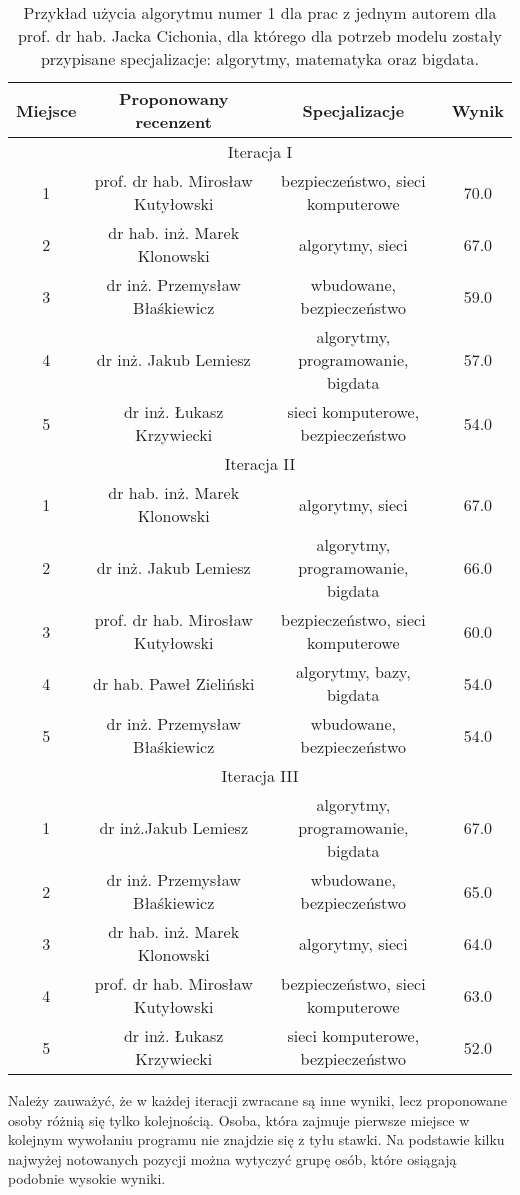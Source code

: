 \begin{table}[h]
        \centering
\begin{tabular}{c|c|c|c}
Miejsce  & Proponowany recenzent& Specjalizacje & Wynik \\  \hline
\multicolumn{4}{c|}{Iteracja I} \\ \hline
1&prof. dr hab. Mirosław Kutyłowski&bezpieczeństwo, sieci komputerowe& 70.0 \\
2&dr hab. inż. Marek Klonowski&algorytmy, sieci&67.0 \\
3&dr inż. Przemysław Błaśkiewicz&wbudowane, bezpieczeństwo& 59.0 \\
4&dr inż. Jakub Lemiesz&algorytmy, programowanie, bigdata& 57.0\\
5&dr inż. Łukasz Krzywiecki& sieci komputerowe, bezpieczeństwo& 54.0\\  \hline
\multicolumn{4}{c|}{Iteracja II} \\ \hline
1&dr hab. inż. Marek Klonowski&algorytmy, sieci&67.0 \\
2&dr inż. Jakub Lemiesz&algorytmy, programowanie, bigdata& 66.0\\
3&prof. dr hab. Mirosław Kutyłowski&bezpieczeństwo, sieci komputerowe& 60.0\\
4&dr hab. Paweł Zieliński&algorytmy, bazy, bigdata& 54.0\\
5&dr inż. Przemysław Błaśkiewicz&wbudowane, bezpieczeństwo& 54.0\\  \hline
\multicolumn{4}{c|}{Iteracja III} \\ \hline
1&dr inż.Jakub Lemiesz&algorytmy, programowanie, bigdata&67.0\\
2&dr inż. Przemysław Błaśkiewicz&wbudowane, bezpieczeństwo& 65.0\\
3&dr hab. inż. Marek Klonowski&algorytmy, sieci&64.0\\
4&prof. dr hab. Mirosław Kutyłowski&bezpieczeństwo, sieci komputerowe&63.0\\
5&dr inż. Łukasz Krzywiecki& sieci komputerowe, bezpieczeństwo&52.0\\  \hline
\end{tabular}
\caption{Przykład użycia algorytmu numer 1 dla prac z jednym autorem dla prof. dr hab. Jacka Cichonia, dla którego dla potrzeb modelu zostały przypisane specjalizacje: algorytmy, matematyka oraz bigdata.}
\label{table:2}
\end{table}

Należy zauważyć, że w każdej iteracji zwracane są inne wyniki, lecz proponowane osoby różnią się tylko kolejnością. Osoba, która zajmuje pierwsze miejsce w kolejnym wywołaniu programu nie znajdzie się z tyłu stawki. Na podstawie kilku najwyżej notowanych pozycji można wytyczyć grupę osób, które osiągają podobnie wysokie wyniki.

